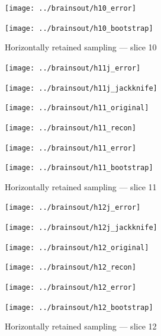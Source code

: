 \documentclass[article]{jdssv}
\begin{document}
\begin{appendix}
\begin{figure}
\begin{centering}
\parbox{\imsize}{\texttt{[image: ../brainsout/h10\_error]}}
\parbox{\imsize}{\texttt{[image: ../brainsout/h10\_bootstrap]}}

\end{centering}
\caption{Horizontally retained sampling --- slice 10}
\end{figure}


\begin{figure}
\begin{centering}

\parbox{\imsize}{\texttt{[image: ../brainsout/h11j\_error]}}
\parbox{\imsize}{\texttt{[image: ../brainsout/h11j\_jackknife]}}

\vspace{\vertsep}

\parbox{\imsize}{\texttt{[image: ../brainsout/h11\_original]}}
\parbox{\imsize}{\texttt{[image: ../brainsout/h11\_recon]}}

\vspace{\vertsep}

\parbox{\imsize}{\texttt{[image: ../brainsout/h11\_error]}}
\parbox{\imsize}{\texttt{[image: ../brainsout/h11\_bootstrap]}}

\end{centering}
\caption{Horizontally retained sampling --- slice 11}
\end{figure}


\begin{figure}
\begin{centering}

\parbox{\imsize}{\texttt{[image: ../brainsout/h12j\_error]}}
\parbox{\imsize}{\texttt{[image: ../brainsout/h12j\_jackknife]}}

\vspace{\vertsep}

\parbox{\imsize}{\texttt{[image: ../brainsout/h12\_original]}}
\parbox{\imsize}{\texttt{[image: ../brainsout/h12\_recon]}}

\vspace{\vertsep}

\parbox{\imsize}{\texttt{[image: ../brainsout/h12\_error]}}
\parbox{\imsize}{\texttt{[image: ../brainsout/h12\_bootstrap]}}

\end{centering}
\caption{Horizontally retained sampling --- slice 12}
\end{figure}


\begin{figure}
\begin{centering}


\end{centering}
\end{figure}
\end{appendix}
\end{document}

